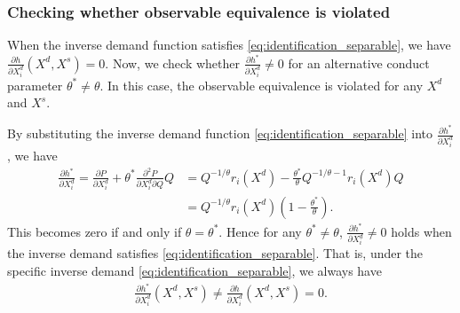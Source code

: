 \documentclass[11pt, a4paper]{article}
\theoremstyle{remark}
\begin{document}
\subsubsection{Checking whether observable equivalence is violated}
When the inverse demand function satisfies \eqref{eq:identification_separable}, we have $\frac{\partial h}{\partial X^{d}_{i}}(X^{d}, X^{s}) = 0$.
Now, we check whether $\frac{\partial h^{*}}{\partial X_{i}^{d}} \ne 0$ for an alternative conduct parameter $\theta^{*} \ne \theta$.
In this case, the observable equivalence is violated for any $X^{d}$ and $X^{s}$.

By substituting the inverse demand function \eqref{eq:identification_separable} into $\frac{\partial h^{*}}{\partial X_{i}^d}$, we have
\begin{align}
    \frac{\partial h^{*}}{\partial X_{i}^d} = \frac{\partial P}{\partial X^{d}_{i}} + \theta^{*} \frac{\partial^2 P}{\partial X^{d}_{i}\partial Q}Q  &= Q^{-1/\theta} r_i(X^d) - \frac{\theta^{*}}{\theta} Q^{-1/\theta-1} r_i(X^d) Q\\
    &= Q^{-1/\theta} r_i(X^d) \left(1 - \frac{\theta^{*}}{\theta} \right).
\end{align}
This becomes zero if and only if $\theta= \theta^{*}$.
Hence for any $\theta^{*} \ne \theta$, $\frac{\partial h^{*}}{\partial X_{i}^{d}} \ne 0$ holds when the inverse demand satisfies \eqref{eq:identification_separable}.
That is, under the specific inverse demand \eqref{eq:identification_separable}, we always have 
\begin{align}
    \frac{\partial h^{*}}{\partial X^{d}_{i}}(X^{d}, X^{s}) \ne \frac{\partial h}{\partial X^{d}_{i}}(X^{d}, X^{s}) = 0.
\end{align}
\end{document}
